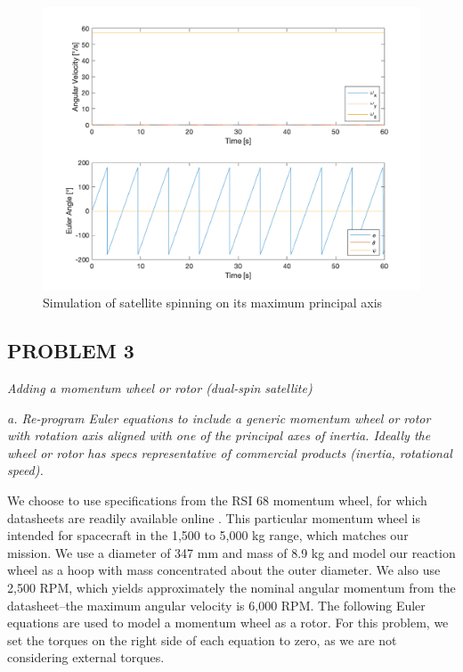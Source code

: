 \begin{figure}[H]
\centering
\includegraphics[scale=0.6]{Images/ps4_problem2a_3.png}
\caption{Simulation of satellite spinning on its maximum principal axis}
\label{fig:ps4_problem2a_3}
\end{figure}

\subsection{PROBLEM 3}
\textit{Adding a momentum wheel or rotor (dual-spin satellite)}

\textit{a. Re-program Euler equations to include a generic momentum wheel or rotor with rotation axis aligned with one of the principal axes of inertia. Ideally the wheel or rotor has specs representative of commercial products (inertia, rotational speed).}

We choose to use specifications from the RSI 68 momentum wheel, for which datasheets are readily available online \cite{RSI68}. This particular momentum wheel is intended for spacecraft in the 1,500 to 5,000 kg range, which matches our mission. We use a diameter of 347 mm and mass of 8.9 kg and model our reaction wheel as a hoop with mass concentrated about the outer diameter. We also use 2,500 RPM, which yields approximately the nominal angular momentum from the datasheet–the maximum angular velocity is 6,000 RPM. The following Euler equations are used to model a momentum wheel as a rotor. For this problem, we set the torques on the right side of each equation to zero, as we are not considering external torques.

